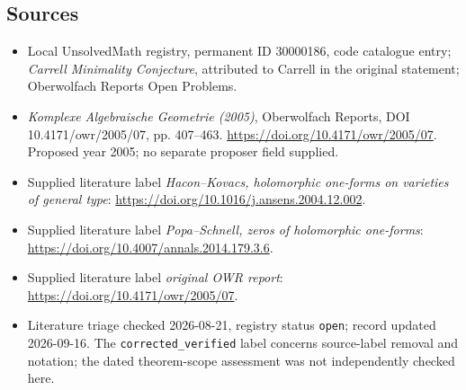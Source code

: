 \documentclass[11pt]{article}
\begin{document}
\subsection{Sources}
\begin{itemize}\item Local UnsolvedMath registry, permanent ID 30000186, code catalogue entry; \emph{Carrell Minimality Conjecture}, attributed to Carrell in the original statement; Oberwolfach Reports Open Problems.\item \emph{Komplexe Algebraische Geometrie (2005)}, Oberwolfach Reports, DOI 10.4171/owr/2005/07, pp. 407--463. \url{https://doi.org/10.4171/owr/2005/07}. Proposed year 2005; no separate proposer field supplied.\item Supplied literature label \emph{Hacon--Kovacs, holomorphic one-forms on varieties of general type}: \url{https://doi.org/10.1016/j.ansens.2004.12.002}.\item Supplied literature label \emph{Popa--Schnell, zeros of holomorphic one-forms}: \url{https://doi.org/10.4007/annals.2014.179.3.6}.\item Supplied literature label \emph{original OWR report}: \url{https://doi.org/10.4171/owr/2005/07}.\item Literature triage checked 2026-08-21, registry status \texttt{open}; record updated 2026-09-16. The \texttt{corrected\_verified} label concerns source-label removal and notation; the dated theorem-scope assessment was not independently checked here.\end{itemize}
\end{document}
